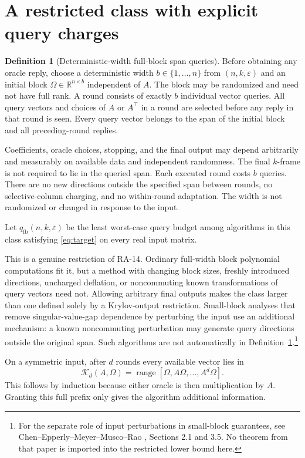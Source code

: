 \documentclass[11pt]{article}
\theoremstyle{definition}
\newtheorem{definition}[theorem]{Definition}
\newcommand{\R}{\mathbb R}
\newcommand{\ran}{\operatorname{range}}
\newcommand{\qfb}{q_{\mathrm{fb}}}
\newcommand{\K}{\mathcal K}
\begin{document}
\section{A restricted class with explicit query charges}\label{sec:model}
\begin{definition}[Deterministic-width full-block span queries]\label{def:fb}
Before obtaining any oracle reply, choose a deterministic width $b\in\{1,\ldots,n\}$ from $(n,k,\varepsilon)$ and an initial block $\Omega\in\R^{n\times b}$ independent of $A$. The block may be randomized and need not have full rank. A round consists of exactly $b$ individual vector queries. All query vectors and choices of $A$ or $A^\top$ in a round are selected before any reply in that round is seen. Every query vector belongs to the span of the initial block and all preceding-round replies.

Coefficients, oracle choices, stopping, and the final output may depend arbitrarily and measurably on available data and independent randomness. The final $k$-frame is not required to lie in the queried span. Each executed round costs $b$ queries. There are no new directions outside the specified span between rounds, no selective-column charging, and no within-round adaptation. The width is not randomized or changed in response to the input.

Let $\qfb(n,k,\varepsilon)$ be the least worst-case query budget among algorithms in this class satisfying \eqref{eq:target} on every real input matrix.
\end{definition}

This is a genuine restriction of RA-14. Ordinary full-width block polynomial computations fit it, but a method with changing block sizes, freshly introduced directions, uncharged deflation, or noncommuting known transformations of query vectors need not. Allowing arbitrary final outputs makes the class larger than one defined solely by a Krylov-output restriction. Small-block analyses that remove singular-value-gap dependence by perturbing the input use an additional mechanism: a known noncommuting perturbation may generate query directions outside the original span. Such algorithms are not automatically in Definition~\ref{def:fb}.\footnote{For the separate role of input perturbations in small-block guarantees, see Chen--Epperly--Meyer--Musco--Rao \cite{blocksize}, Sections 2.1 and 3.5. No theorem from that paper is imported into the restricted lower bound here.}

On a symmetric input, after $d$ rounds every available vector lies in
\begin{equation}\label{eq:krylov}
\K_d(A,\Omega)=\ran[\Omega,A\Omega,\ldots,A^d\Omega].
\end{equation}
This follows by induction because either oracle is then multiplication by $A$. Granting this full prefix only gives the algorithm additional information.
\end{document}
